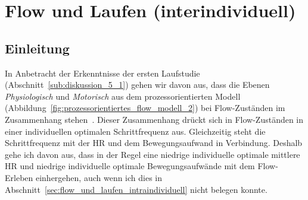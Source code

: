 

\section{Flow und Laufen (interindividuell)} 

\label{sec:flow_und_laufen_interindividuell}

\subsection{Einleitung} 

\label{sub:einleitung_5_3}

In Anbetracht der Erkenntnisse der ersten Laufstudie (Abschnitt~\ref{sub:diskussion_5_1}) gehen wir davon aus, dass die Ebenen \emph{Physiologisch} und \emph{Motorisch} aus dem prozessorientierten Modell (Abbildung~\ref{fig:prozessorientiertes_flow_modell_2}) bei Flow-Zuständen im Zusammenhang stehen~\citep{Grueter2016a}. Dieser Zusammenhang drückt sich in Flow-Zuständen in einer individuellen optimalen Schrittfrequenz aus. Gleichzeitig steht die Schrittfrequenz mit der \ac{HR} und dem Bewegungsaufwand in Verbindung. Deshalb gehe ich davon aus, dass in der Regel eine niedrige individuelle optimale mittlere \ac{HR} und niedrige individuelle optimale Bewegungsaufwände mit dem Flow-Erleben einhergehen, auch wenn ich dies in Abschnitt~\ref{sec:flow_und_laufen_intraindividuell} nicht belegen konnte. 

